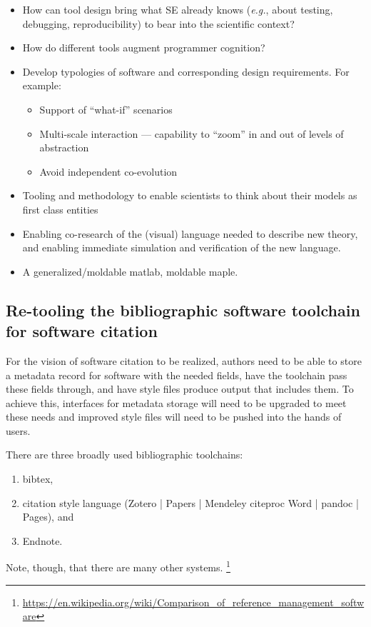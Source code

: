 \documentclass[a4paper,UKenglish]{dagman}
\newcommand{\eg}{\emph{e.g.},\xspace}
\begin{document}
\begin{itemize}
\item How can tool design bring what SE already knows (\eg about testing, debugging, reproducibility) to bear into the scientific context?
\item How do different tools augment programmer cognition?
\item Develop typologies of software and corresponding design requirements. For example:
    \begin{itemize}
    \item Support of ``what-if'' scenarios
    \item Multi-scale interaction --- capability to ``zoom'' in and out of levels of abstraction
    \item Avoid independent co-evolution
    \end{itemize}
\item Tooling and methodology to enable scientists to think about their models as first class entities
\item Enabling co-research of the (visual) language needed to describe new theory, and enabling immediate simulation and verification of the new language.
\item A generalized/moldable matlab, moldable maple.
\end{itemize}

\subsection{Re-tooling the bibliographic software toolchain for software citation}

For the vision of software citation to be realized, authors need to be able to store a metadata record for software with the needed fields, have the toolchain pass these fields through, and have style files produce output that includes them. To achieve this, interfaces for metadata storage will need to be upgraded to meet these needs and improved style files will need to be pushed into the hands of users.

There are three broadly used bibliographic toolchains:
\begin{enumerate}
\item bibtex, 
\item citation style language (Zotero | Papers | Mendeley \ra citeproc \ra Word | pandoc | Pages),  and \item Endnote.
\end{enumerate}
Note, though, that there are many other systems.%
\footnote{\url{https://en.wikipedia.org/wiki/Comparison_of_reference_management_software}}
\end{document}
